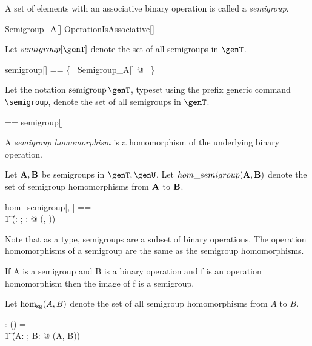 \documentclass{amsart}
\begin{document}
A set of elements with an associative binary operation is called a \textit{semigroup}.
\begin{schema}{Semigroup\_A}[\genT]
	OperationIsAssociative[\genT]
\end{schema}

Let $semigroup[\genT]$ denote the set of all semigroups in $\genT$.

\begin{zed}
	semigroup[\genT] == \{~ Semigroup\_A[\genT] @ \strucA  ~\}
\end{zed}

Let the notation $\semigroup \genT$, typeset using the prefix generic command \verb|\semigroup|,
denote the set of all semigroups in $\genT$.

\begin{zed}
	\semigroup \genT == semigroup[\genT]
\end{zed}

\begin{remark}
\begin{zed}
	\semigroup \setT \subseteq \binop \setT
\end{zed}
\end{remark}

A \textit{semigroup homomorphism} is a homomorphism of the underlying binary operation.

Let $\mathbf{A}, \mathbf{B}$ be semigroups in $\genT, \genU$.
Let $hom\_semigroup(\mathbf{A}, \mathbf{B})$ denote the set of semigroup homomorphisms from $\mathbf{A}$ to $\mathbf{B}$.

\begin{zed}
	hom\_semigroup[\genT, \genU] == \\
	\t1	(\lambda \strucA: \semigroup \genT; \strucB: \semigroup \genU @ \homBinOp(\strucA, \strucB))
\end{zed}

Note that as a type, semigroups are a subset of binary operations.
The operation homomorphisms of a semigroup are the same as the semigroup homomorphisms.

If A is a semigroup and B is a binary operation and f is an operation homomorphism then the image of f is a semigroup.

Let $\operatorname{hom_{sg}}(A, B)$ denote the set of all semigroup homomorphisms from $A$ to $B$.

\begin{gendef}[\genT, \genU]
	\homSemigroup: \semigroup \genT \cross \semigroup \genU \fun \power (\genT \pfun \genU)
\where
	\homSemigroup = \\
	\t1	(\lambda A: \semigroup \genT; B: \semigroup \genU @ \homBinOp(A, B))
\end{gendef}
\end{document}
